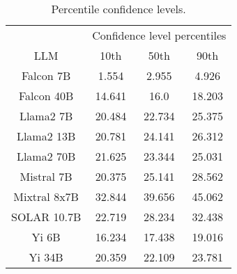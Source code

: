 \begin{table*}
\centering
\begin{tabular}{c|c|c|c}
& \multicolumn{3}{c}{Confidence level percentiles} \\ 
LLM & 10th & 50th & 90th\\ \hline
Falcon 7B & 1.554 & 2.955 & 4.926\\
Falcon 40B & 14.641 & 16.0 & 18.203\\
Llama2 7B & 20.484 & 22.734 & 25.375\\
Llama2 13B & 20.781 & 24.141 & 26.312\\
Llama2 70B & 21.625 & 23.344 & 25.031\\
Mistral 7B & 20.375 & 25.141 & 28.562\\
Mixtral 8x7B & 32.844 & 39.656 & 45.062\\
SOLAR 10.7B & 22.719 & 28.234 & 32.438\\
Yi 6B & 16.234 & 17.438 & 19.016\\
Yi 34B & 20.359 & 22.109 & 23.781\\
\hline
\end{tabular}
\caption{Percentile confidence levels.}
\label{tab:percentile_conf}
\end{table*}
